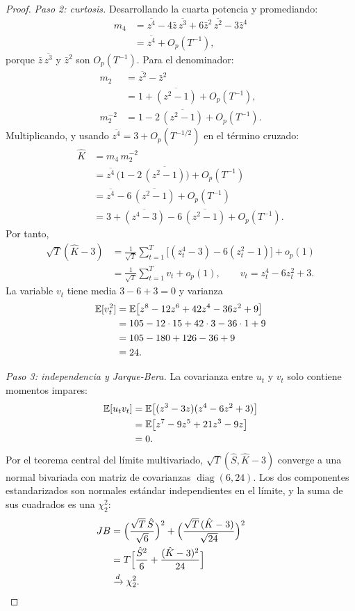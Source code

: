 \begin{proof}
\emph{Paso 2: curtosis.} Desarrollando la cuarta potencia y promediando:
\begin{align*}
  m_4 &= \overline{z^4}-4\bar z\,\overline{z^3}+6\bar z^2\,\overline{z^2}-3\bar z^4\\
      &= \overline{z^4}+O_p(T^{-1}),
\end{align*}
porque $\bar z\,\overline{z^3}$ y $\bar z^2$ son $O_p(T^{-1})$. Para el denominador:
\begin{align*}
  m_2      &= \overline{z^2}-\bar z^2\\
           &= 1+\overline{(z^2-1)}+O_p(T^{-1}),\\
  m_2^{-2} &= 1-2\,\overline{(z^2-1)}+O_p(T^{-1}).
\end{align*}
Multiplicando, y usando $\overline{z^4}=3+O_p(T^{-1/2})$ en el término cruzado:
\begin{align*}
  \hat K &= m_4\,m_2^{-2}\\
         &= \overline{z^4}\,\bigl(1-2\,\overline{(z^2-1)}\bigr)+O_p(T^{-1})\\
         &= \overline{z^4}-6\,\overline{(z^2-1)}+O_p(T^{-1})\\
         &= 3+\overline{(z^4-3)}-6\,\overline{(z^2-1)}+O_p(T^{-1}).
\end{align*}
Por tanto,
\begin{align*}
  \sqrt T(\hat K-3) &= \frac1{\sqrt T}\sum_{t=1}^T\bigl[(z_t^4-3)-6(z_t^2-1)\bigr]+o_p(1)\\
                    &= \frac1{\sqrt T}\sum_{t=1}^Tv_t+o_p(1), \qquad v_t=z_t^4-6z_t^2+3 .
\end{align*}
La variable $v_t$ tiene media $3-6+3=0$ y varianza
\begin{align*}
  \mathbb{E}[v_t^2] &= \mathbb{E}\bigl[z^8-12z^6+42z^4-36z^2+9\bigr]\\
            &= 105-12\cdot15+42\cdot3-36\cdot1+9\\
            &= 105-180+126-36+9\\
            &= 24 .
\end{align*}

\emph{Paso 3: independencia y Jarque-Bera.} La covarianza entre $u_t$ y $v_t$ solo contiene momentos
impares:
\begin{align*}
  \mathbb{E}[u_tv_t] &= \mathbb{E}\bigl[(z^3-3z)(z^4-6z^2+3)\bigr]\\
             &= \mathbb{E}\bigl[z^7-9z^5+21z^3-9z\bigr]\\
             &= 0 .
\end{align*}
Por el teorema central del límite multivariado, $\sqrt T(\hat S,\hat K-3)$ converge a una normal bivariada
con matriz de covarianzas $\operatorname{diag}(6,24)$. Los dos componentes estandarizados son normales
estándar independientes en el límite, y la suma de sus cuadrados es una $\chi^2_2$:
\begin{align*}
  JB &= \Bigl(\frac{\sqrt T\,\hat S}{\sqrt6}\Bigr)^2+\Bigl(\frac{\sqrt T\,(\hat K-3)}{\sqrt{24}}\Bigr)^2\\
     &= T\Bigl[\frac{\hat S^2}{6}+\frac{(\hat K-3)^2}{24}\Bigr]\\
     &\xrightarrow{d}\chi^2_2 . && \qedhere
\end{align*}
\end{proof}

